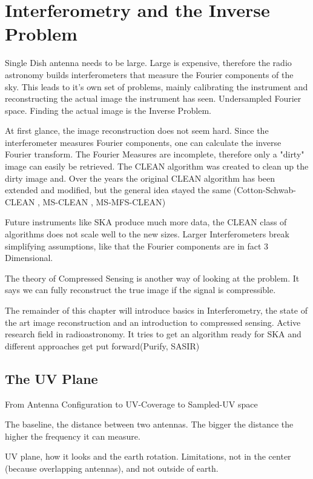 \section{Interferometry and the Inverse Problem}\label{intro}
Single Dish antenna needs to be large. Large is expensive, therefore the radio astronomy builds interferometers that measure the Fourier components of the sky. This leads to it's own set of problems, mainly calibrating the instrument and reconstructing the actual image the instrument has seen.  Undersampled Fourier space. Finding the actual image is the Inverse Problem.

At first glance, the image reconstruction does not seem hard. Since the interferometer measures Fourier components, one can calculate the inverse Fourier transform. The Fourier Measures are incomplete, therefore only a "dirty" image can easily be retrieved. The CLEAN \cite{hogbom1974aperture} algorithm was created to clean up the dirty image and. Over the years the original CLEAN algorithm has been extended and modified, but the general idea stayed the same (Cotton-Schwab-CLEAN \cite{schwab1984relaxing}, MS-CLEAN \cite{rich2008multi}, MS-MFS-CLEAN\cite{rau2011multi})

Future instruments like SKA produce much more data, the CLEAN class of algorithms does not scale well to the new sizes. Larger Interferometers break simplifying assumptions, like that the Fourier components are in fact 3 Dimensional.

The theory of Compressed Sensing \cite{candes2006robust} \cite{donoho2006compressed} is another way of looking at the problem. It says we can fully reconstruct the true image if the signal is compressible.

The remainder of this chapter will introduce basics in Interferometry, the state of the art image reconstruction and an introduction to compressed sensing. Active research field in radioastronomy. It tries to get an algorithm ready for SKA and different approaches get put forward(Purify, SASIR)

\subsection{The UV Plane}

From Antenna Configuration to UV-Coverage to Sampled-UV space

The baseline, the distance between two antennas. The bigger the distance the higher the frequency it can measure.

UV plane, how it looks and the earth rotation. Limitations, not in the center (because overlapping antennas), and not outside of earth.

